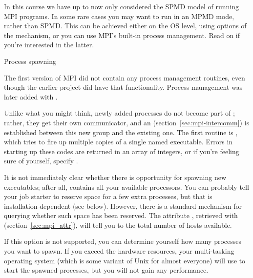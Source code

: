 
In this course we have up to now only considered the \ac{SPMD} model
of running MPI programs.  In some rare cases you may want to run in an
\ac{MPMD} mode, rather than \ac{SPMD}. This can be achieved either on
the \ac{OS} level, using options of the  mechanism,
or you can use MPI's built-in process management. Read on if you're
interested in the latter.

 {Process spawning}
\label{sec:mpi-dynamic}

The first version of MPI did not contain any process management
routines, even though the earlier  project did have
that functionality. Process management was later added with .

Unlike what you might think, newly added processes do not become part
of ; rather, they get their own communicator, and an
 (section~\ref{sec:mpi-intercomm})
is established between this new group
and the existing one. The first routine is
, which tries to fire up multiple copies
of a single named executable.
Errors in starting up these codes are returned in an array of integers, or
if you're feeling sure of yourself, specify .

It is not immediately clear whether there is opportunity for spawning
new executables; after all,  contains all
your available processors. You can probably tell your job starter to
reserve space for a few extra processes, but that is
installation-dependent (see below). However, there is a standard
mechanism for querying whether such space has been reserved.  The
attribute , retrieved with
 (section~\ref{sec:mpi_attr}), will tell
you to the total number of hosts available.

If this option is not supported, you can determine yourself how many
processes you want to spawn. If you exceed the hardware resources,
your multi-tasking operating system (which is some variant of Unix for
almost everyone) will use  to start the
spawned processes, but you will not gain any performance.

